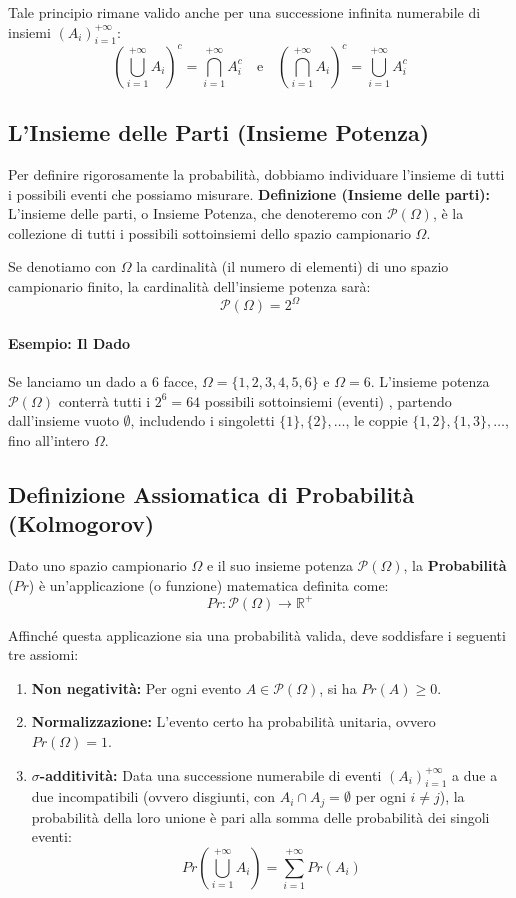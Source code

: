 \documentclass[12pt, a4paper]{article}
\begin{document}
Tale principio rimane valido anche per una successione infinita numerabile di insiemi $(A_i)_{i=1}^{+\infty}$:
$$ \left(\bigcup_{i=1}^{+\infty} A_i\right)^c = \bigcap_{i=1}^{+\infty} A_i^c \quad \text{e} \quad \left(\bigcap_{i=1}^{+\infty} A_i\right)^c = \bigcup_{i=1}^{+\infty} A_i^c $$ 

\subsection{L'Insieme delle Parti (Insieme Potenza)}
Per definire rigorosamente la probabilità, dobbiamo individuare l'insieme di tutti i possibili eventi che possiamo misurare.
\textbf{Definizione (Insieme delle parti):} L'insieme delle parti, o Insieme Potenza, che denoteremo con $\mathcal{P}(\Omega)$, è la collezione di tutti i possibili sottoinsiemi dello spazio campionario $\Omega$.

Se denotiamo con $\Omega$ la cardinalità (il numero di elementi) di uno spazio campionario finito, la cardinalità dell'insieme potenza sarà:
$$ \mathcal{P}(\Omega) = 2^{\Omega} $$ 

\paragraph{Esempio: Il Dado}
Se lanciamo un dado a 6 facce, $\Omega = \{1, 2, 3, 4, 5, 6\}$ e $\Omega = 6$.
L'insieme potenza $\mathcal{P}(\Omega)$ conterrà tutti i $2^6 = 64$ possibili sottoinsiemi (eventi) , partendo dall'insieme vuoto $\emptyset$, includendo i singoletti $\{1\}, \{2\}, \dots$, le coppie $\{1,2\}, \{1,3\}, \dots$, fino all'intero $\Omega$.

\subsection{Definizione Assiomatica di Probabilità (Kolmogorov)}
Dato uno spazio campionario $\Omega$ e il suo insieme potenza $\mathcal{P}(\Omega)$, la \textbf{Probabilità} ($Pr$) è un'applicazione (o funzione) matematica definita come:
$$ Pr: \mathcal{P}(\Omega) \rightarrow \mathbb{R}^+ $$ 

Affinché questa applicazione sia una probabilità valida, deve soddisfare i seguenti tre assiomi:
\begin{enumerate}
    \item \textbf{Non negatività:} Per ogni evento $A \in \mathcal{P}(\Omega)$, si ha $Pr(A) \ge 0$.
    \item \textbf{Normalizzazione:} L'evento certo ha probabilità unitaria, ovvero $Pr(\Omega) = 1$.
    \item \textbf{$\sigma$-additività:} Data una successione numerabile di eventi $(A_i)_{i=1}^{+\infty}$ a due a due incompatibili (ovvero disgiunti, con $A_i \cap A_j = \emptyset$ per ogni $i \ne j$), la probabilità della loro unione è pari alla somma delle probabilità dei singoli eventi:
    $$ Pr\left(\bigcup_{i=1}^{+\infty} A_i\right) = \sum_{i=1}^{+\infty} Pr(A_i) $$ 
\end{enumerate}
\end{document}
